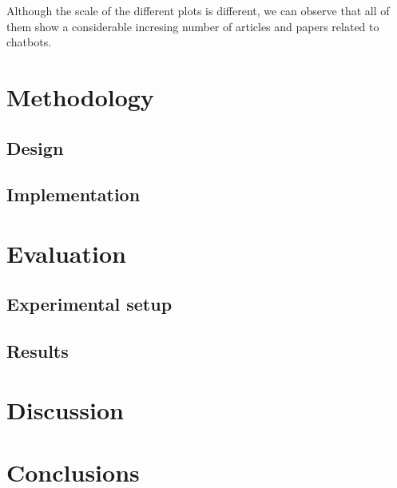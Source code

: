 \documentclass[12pt,english]{article}
\begin{document}
Although the scale of the different plots is different, we can observe that all of them show a considerable incresing number of articles and papers related to chatbots.

\section{Methodology}

\subsection{Design}

\subsection{Implementation}


\section{Evaluation}

\subsection{Experimental setup}

\subsection{Results}


\section{Discussion}

\section{Conclusions}


\newpage


\end{document}
